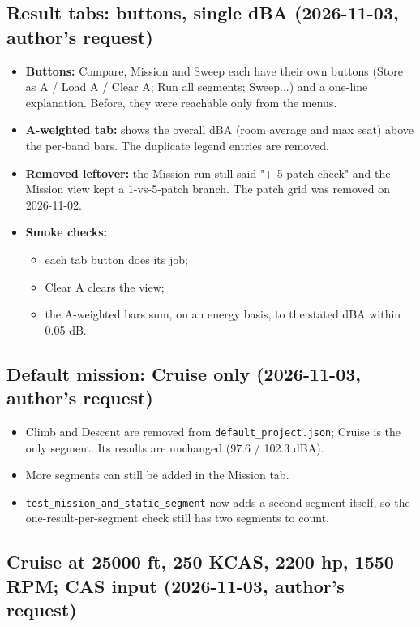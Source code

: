 \documentclass[10pt,a4paper]{article}
\begin{document}
\subsection*{Result tabs: buttons, single dBA (2026-11-03, author's request)}

\begin{itemize}
\item \textbf{Buttons:} Compare, Mission and Sweep each have their own buttons (Store as A / Load A / Clear A; Run all segments; Sweep...) and a one-line explanation. Before, they were reachable only from the menus.
\item \textbf{A-weighted tab:} shows the overall dBA (room average and max seat) above the per-band bars. The duplicate legend entries are removed.
\item \textbf{Removed leftover:} the Mission run still said "+ 5-patch check" and the Mission view kept a 1-vs-5-patch branch. The patch grid was removed on 2026-11-02.
\item \textbf{Smoke checks:}
\begin{itemize}
\item each tab button does its job;
\item Clear A clears the view;
\item the A-weighted bars sum, on an energy basis, to the stated dBA within 0.05 dB.
\end{itemize}
\end{itemize}

\subsection*{Default mission: Cruise only (2026-11-03, author's request)}

\begin{itemize}
\item Climb and Descent are removed from \texttt{default\_\allowbreak{}project.\allowbreak{}json}; Cruise is the only segment. Its results are unchanged (97.6 / 102.3 dBA).
\item More segments can still be added in the Mission tab.
\item \texttt{test\_\allowbreak{}mission\_\allowbreak{}and\_\allowbreak{}static\_\allowbreak{}segment} now adds a second segment itself, so the one-result-per-segment check still has two segments to count.
\end{itemize}

\subsection*{Cruise at 25000 ft, 250 KCAS, 2200 hp, 1550 RPM; CAS input (2026-11-03, author's request)}
\end{document}
